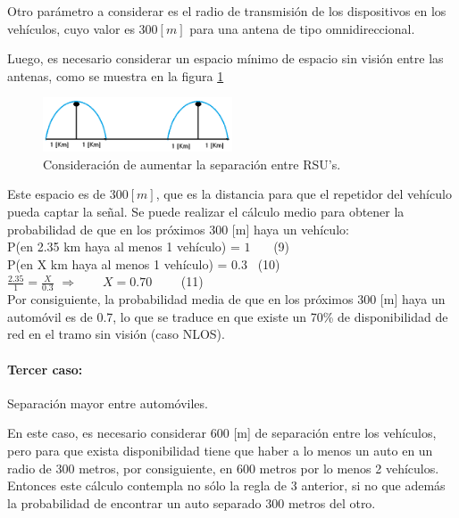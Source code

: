 \documentclass[12pt]{article}
\begin{document}
Otro parámetro a considerar es el radio de transmisión de los dispositivos en los vehículos, cuyo 
valor es $300[m]$ para una antena de tipo omnidireccional.

Luego, es necesario considerar un espacio mínimo de espacio sin visión entre las antenas, 
como se muestra en la figura \ref{fig:adhoc2}
\begin{figure}[H]
  \centering
      \includegraphics[width=0.5\textwidth]{adhoc2}
	    \caption{Consideración de aumentar la separación entre RSU's.}
	\label{fig:adhoc2}
\end{figure}

Este espacio es de $300[m]$, que es la distancia para que el repetidor del vehículo pueda captar la señal. 
Se puede realizar el cálculo medio para obtener la probabilidad de que en los próximos 300 [m] haya un 
vehículo:\\

P(en 2.35 km haya al menos 1 vehículo) = $1$ \qquad \ \ \ \qquad \footnotesize (9) \normalsize\\            

P(en X km haya al menos 1 vehículo) = $0.3$ \qquad \quad \ \qquad \footnotesize (10) \normalsize \\        

\Large $\frac{2.35}{1} = \frac{X}{0.3}$ \normalsize \qquad $\Rightarrow \qquad X = 0.70$
\qquad \ \qquad \ \qquad \ \qquad \ \footnotesize (11) \normalsize\\

Por consiguiente, la probabilidad media de que en los próximos 300 [m] haya un automóvil es de 0.7, 
lo que se traduce en que existe un 70\% de disponibilidad de red en el tramo sin visión (caso NLOS).\\
\paragraph{Tercer caso:} Separación mayor entre automóviles.

En este caso, es necesario considerar 600 [m] de separación entre los vehículos, pero para que exista 
disponibilidad tiene que haber a lo menos un auto en un radio de 300 metros, por consiguiente,
en 600 metros por lo menos 2 vehículos.
Entonces este cálculo contempla no sólo la regla de 3 anterior, si no que además la probabilidad de 
encontrar un auto separado 300 metros del otro.
\end{document}
